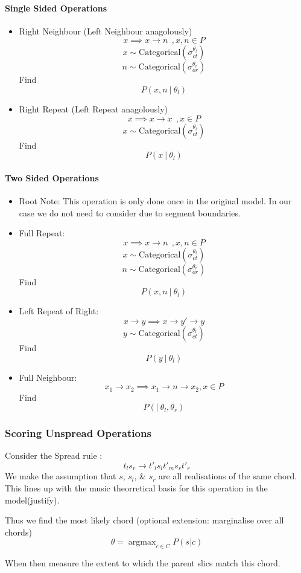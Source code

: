 \documentclass[12pt,a4paper,twoside,openright]{report} \usepackage[pdfborder={0 0 0}]{hyperref}    %
\theoremstyle{definition} \newtheorem{definition}{Definition}[section]
\begin{document}
    \paragraph{Single Sided Operations} \begin{itemize} \item Right Neighbour (Left Neighbour anagolously) \[ x \implies
      x \to n~~, x,n \in P \] \[x \sim \text{Categorical}(\sigma_{ct}^{\theta_l})\] \[n \sim
      \text{Categorical}(\sigma_{or}^{\theta_r})\] Find \[P(x,n~|~\theta_l)\] \item Right Repeat (Left Repeat
      anagolously) \[ x \implies x \to x~~, x \in P \] \[x \sim \text{Categorical}(\sigma_{ct}^{\theta_l})\] Find
    \[P(x~|~\theta_l)\] \end{itemize} \paragraph{Two Sided Operations} \begin{itemize} \item Root Note: This operation
    is only done once in the original model. In our case we do not need to consider due to segment boundaries. \item
    Full Repeat: \[ x \implies x \to n~~, x,n \in P \] \[x \sim \text{Categorical}(\sigma_{ct}^{\theta_l})\] \[n \sim
    \text{Categorical}(\sigma_{or}^{\theta_r})\] Find \[P(x,n~|~\theta_l)\] \item Left Repeat of Right: \[ x \to
    y \implies x \to y' \to y \] \[y \sim \text{Categorical}(\sigma_{ct}^{\theta_l})\] Find \[P(y~|~\theta_l)\] \item
    Full Neighbour: \[ x_1 \to x_2 \implies x_1 \to n \to x_2, x \in P \]
  Find \[P(|~\theta_l,\theta_r)\] \end{itemize}

  \FloatBarrier \subsubsection{Scoring Unspread Operations}

  Consider the Spread rule : \[t_l s_r \to t'_l s_l t'_m s_r t'_r\] We make the assumption that $s$, $s_l$, \& $s_r$ are
  all realisations of the same chord. This lines up with the music theorretical basis for this operation in the
  model(justify). \par Thus we find the most likely chord (optional extension: marginalise over all chords) \[\theta
  = \mathop{argmax}_{c \in C} P (s|c)\] \par When then measure the extent to which the parent slics match this chord.
\end{document}
